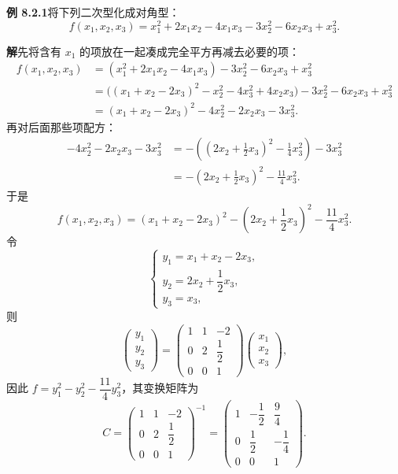 \documentclass[UTF8,12pt,a4paper,fontset=fandol]{ctexart}
\begin{document}
\noindent\textbf{例 8.2.1}\quad 将下列二次型化成对角型：
\[
f(x_1,x_2,x_3)=x_1^2+2x_1x_2-4x_1x_3-3x_2^2-6x_2x_3+x_3^2.
\]

\noindent\textbf{解}\quad 先将含有 $x_1$ 的项放在一起凑成完全平方再减去必要的项：
\[
\begin{aligned}
f(x_1,x_2,x_3)
&=(x_1^2+2x_1x_2-4x_1x_3)-3x_2^2-6x_2x_3+x_3^2\\
&=\bigl((x_1+x_2-2x_3)^2-x_2^2-4x_3^2+4x_2x_3\bigr)-3x_2^2-6x_2x_3+x_3^2\\
&=(x_1+x_2-2x_3)^2-4x_2^2-2x_2x_3-3x_3^2.
\end{aligned}
\]
再对后面那些项配方：
\[
\begin{aligned}
-4x_2^2-2x_2x_3-3x_3^2
&=-\left(\left(2x_2+\frac12x_3\right)^2-\frac14x_3^2\right)-3x_3^2\\
&=-\left(2x_2+\frac12x_3\right)^2-\frac{11}{4}x_3^2.
\end{aligned}
\]
于是
\[
f(x_1,x_2,x_3)=(x_1+x_2-2x_3)^2-\left(2x_2+\frac12x_3\right)^2-\frac{11}{4}x_3^2.
\]
令
\[
\left\{\begin{array}{l}
y_1=x_1+x_2-2x_3,\\
y_2=2x_2+\dfrac12x_3,\\
y_3=x_3,
\end{array}\right.
\]
则
\[
\left(\begin{array}{c}
y_1\\
y_2\\
y_3
\end{array}\right)
=
\left(\begin{array}{ccc}
1&1&-2\\
0&2&\dfrac12\\
0&0&1
\end{array}\right)
\left(\begin{array}{c}
x_1\\
x_2\\
x_3
\end{array}\right),
\]
因此 $f=y_1^2-y_2^2-\dfrac{11}{4}y_3^2$，其变换矩阵为
\[
C=
\left(\begin{array}{ccc}
1&1&-2\\
0&2&\dfrac12\\
0&0&1
\end{array}\right)^{-1}
=
\left(\begin{array}{ccc}
1&-\dfrac12&\dfrac94\\
0&\dfrac12&-\dfrac14\\
0&0&1
\end{array}\right).
\]
\end{document}
